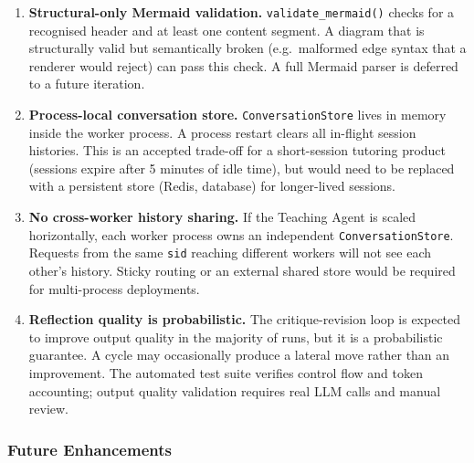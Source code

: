 \begin{enumerate}[leftmargin=*, label=\textbf{L\arabic*.}]

  \item \textbf{Structural-only Mermaid validation.}
  \texttt{validate\_mermaid()} checks for a recognised header and at least one content segment. A diagram that is structurally valid but semantically broken (e.g.\ malformed edge syntax that a renderer would reject) can pass this check. A full Mermaid parser is deferred to a future iteration.

  \item \textbf{Process-local conversation store.}
  \texttt{ConversationStore} lives in memory inside the worker process. A process restart clears all in-flight session histories. This is an accepted trade-off for a short-session tutoring product (sessions expire after 5 minutes of idle time), but would need to be replaced with a persistent store (Redis, database) for longer-lived sessions.

  \item \textbf{No cross-worker history sharing.}
  If the Teaching Agent is scaled horizontally, each worker process owns an independent \texttt{ConversationStore}. Requests from the same \texttt{sid} reaching different workers will not see each other's history. Sticky routing or an external shared store would be required for multi-process deployments.

  \item \textbf{Reflection quality is probabilistic.}
  The critique-revision loop is expected to improve output quality in the majority of runs, but it is a probabilistic guarantee. A cycle may occasionally produce a lateral move rather than an improvement. The automated test suite verifies control flow and token accounting; output quality validation requires real LLM calls and manual review.

\end{enumerate}

\subsubsection{Future Enhancements}


